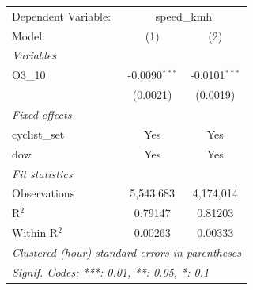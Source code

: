 \begingroup
\centering
\begin{tabular}{lcc}
   \tabularnewline \midrule \midrule
   Dependent Variable: & \multicolumn{2}{c}{speed\_kmh}\\
   Model:        & (1)             & (2)\\  
   \midrule
   \emph{Variables}\\
   O3\_10        & -0.0090$^{***}$ & -0.0101$^{***}$\\   
                 & (0.0021)        & (0.0019)\\   
   \midrule
   \emph{Fixed-effects}\\
   cyclist\_set  & Yes             & Yes\\  
   dow           & Yes             & Yes\\  
   \midrule
   \emph{Fit statistics}\\
   Observations  & 5,543,683       & 4,174,014\\  
   R$^2$         & 0.79147         & 0.81203\\  
   Within R$^2$  & 0.00263         & 0.00333\\  
   \midrule \midrule
   \multicolumn{3}{l}{\emph{Clustered (hour) standard-errors in parentheses}}\\
   \multicolumn{3}{l}{\emph{Signif. Codes: ***: 0.01, **: 0.05, *: 0.1}}\\
\end{tabular}
\par\endgroup
